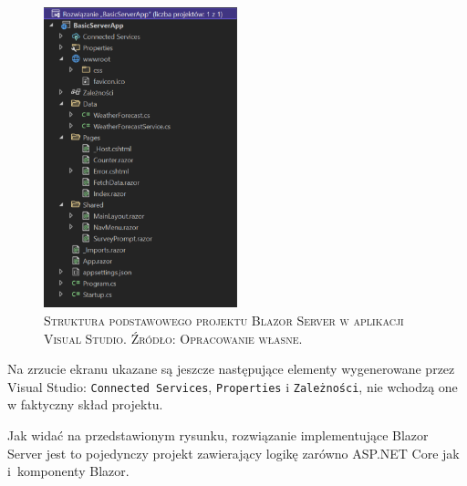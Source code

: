 \documentclass[12pt,a4paper,oneside]{book}
\newcommand{\captionT}[1]{\caption{\textsc{\footnotesize{#1}}}}
\begin{document}
\begin{figure}[H]
\centering
\includegraphics[width=0.5\textwidth]{images/BasicBlazorServerApp.pdf}
\captionT{Struktura podstawowego projektu Blazor Server w aplikacji Visual Studio. Źródło: Opracowanie własne.}
\label{rys_basic_app_blazor_server}
\end{figure}

Na zrzucie ekranu ukazane są jeszcze następujące elementy wygenerowane przez Visual Studio: \texttt{Connected Services}, \texttt{Properties} i \texttt{Zależności}, nie wchodzą one w faktyczny skład projektu.

Jak widać na przedstawionym rysunku, rozwiązanie implementujące Blazor Server jest to pojedynczy projekt zawierający logikę zarówno ASP.NET Core jak i~komponenty Blazor.
\end{document}
